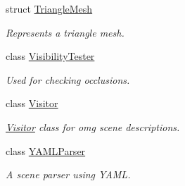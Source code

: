 \begin{DoxyCompactItemize}
struct \mbox{\hyperlink{structomg_1_1_triangle_mesh}{Triangle\+Mesh}}
\begin{DoxyCompactList}\small\item\em Represents a triangle mesh. \end{DoxyCompactList}\item 
class \mbox{\hyperlink{classomg_1_1_visibility_tester}{Visibility\+Tester}}
\begin{DoxyCompactList}\small\item\em Used for checking occlusions. \end{DoxyCompactList}\item 
class \mbox{\hyperlink{classomg_1_1_visitor}{Visitor}}
\begin{DoxyCompactList}\small\item\em \mbox{\hyperlink{classomg_1_1_visitor}{Visitor}} class for omg scene descriptions. \end{DoxyCompactList}\item 
class \mbox{\hyperlink{classomg_1_1_y_a_m_l_parser}{Y\+A\+M\+L\+Parser}}
\begin{DoxyCompactList}\small\item\em A scene parser using Y\+A\+ML. \end{DoxyCompactList}\end{DoxyCompactItemize}
